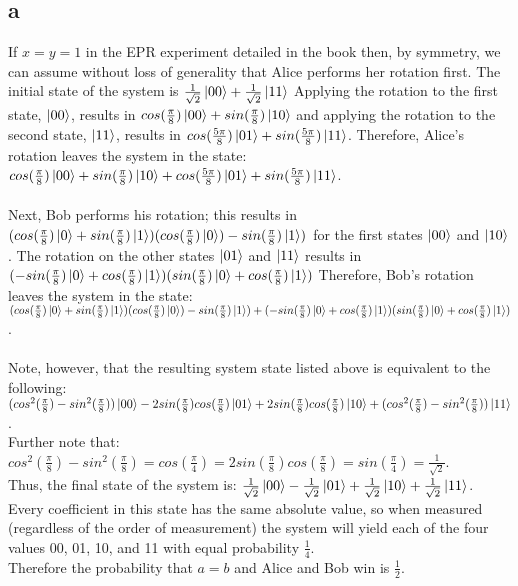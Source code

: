 \documentclass[letterpaper,notitlepage,twoside]{article}
\begin{document}
\subsection*{a}
If $x=y=1$ in the EPR experiment detailed in the book then, by symmetry, we can assume without loss of generality that Alice performs her rotation first. The initial state of the system is $\frac{1}{\sqrt{2}} \ket{00} + \frac{1}{\sqrt{2}} \ket{11}$ Applying the rotation to the first state, $\ket{00}$, results in $cos(\frac{\pi}{8}) \ket{00} + sin(\frac{\pi}{8}) \ket{10}$ and applying the rotation to the second state, $\ket{11}$, results in $cos(\frac{5\pi}{8}) \ket{01} + sin(\frac{5\pi}{8}) \ket{11}$. Therefore, Alice's rotation leaves the system in the state: $cos(\frac{\pi}{8}) \ket{00} + sin(\frac{\pi}{8}) \ket{10} + cos(\frac{5\pi}{8}) \ket{01} + sin(\frac{5\pi}{8}) \ket{11}$. \\\\
Next, Bob performs his rotation; this results in $(cos(\frac{\pi}{8}) \ket{0} + sin(\frac{\pi}{8}) \ket{1})(cos(\frac{\pi}{8}) \ket{0}) - sin(\frac{\pi}{8})\ket{1})$ for the first states $\ket{00}$ and $\ket{10}$. The rotation on the other states $\ket{01}$ and $\ket{11}$ results in $(-sin(\frac{\pi}{8}) \ket{0} + cos(\frac{\pi}{8}) \ket{1})(sin(\frac{\pi}{8}) \ket{0} + cos(\frac{\pi}{8}) \ket{1})$
Therefore, Bob's rotation leaves the system in the state: \\
 $(cos(\frac{\pi}{8}) \ket{0} + sin(\frac{\pi}{8}) \ket{1})(cos(\frac{\pi}{8}) \ket{0}) - sin(\frac{\pi}{8})\ket{1}) + (-sin(\frac{\pi}{8}) \ket{0} + cos(\frac{\pi}{8}) \ket{1})(sin(\frac{\pi}{8}) \ket{0} + cos(\frac{\pi}{8}) \ket{1})$. \\\\
Note, however, that the resulting system state listed above is equivalent to the following: $(cos^{2}(\frac{\pi}{8}) - sin^{2}(\frac{\pi}{8})) \ket{00} - 2sin(\frac{\pi}{8})cos(\frac{\pi}{8}) \ket{01} + 2sin(\frac{\pi}{8})cos(\frac{\pi}{8}) \ket{10} + (cos^{2}(\frac{\pi}{8}) - sin^{2}(\frac{\pi}{8})) \ket{11}$.\\
Further note that: $cos^{2}(\frac{\pi}{8}) - sin^{2}(\frac{\pi}{8}) = cos(\frac{\pi}{4}) = 2sin(\frac{\pi}{8})cos(\frac{\pi}{8}) = sin(\frac{\pi}{4}) = \frac{1}{\sqrt{2}}$. \\
Thus, the final state of the system is: $\frac{1}{\sqrt{2}} \ket{00} - \frac{1}{\sqrt{2}} \ket{01} + \frac{1}{\sqrt{2}} \ket{10} + \frac{1}{\sqrt{2}} \ket{11}$. \\
Every coefficient in this state has the same absolute value, so when measured (regardless of the order of measurement) the system will yield each of the four values 00, 01, 10, and 11 with equal probability $\frac{1}{4}$. \\
Therefore the probability that $a=b$ and Alice and Bob win is $\frac{1}{2}$.
\end{document}

